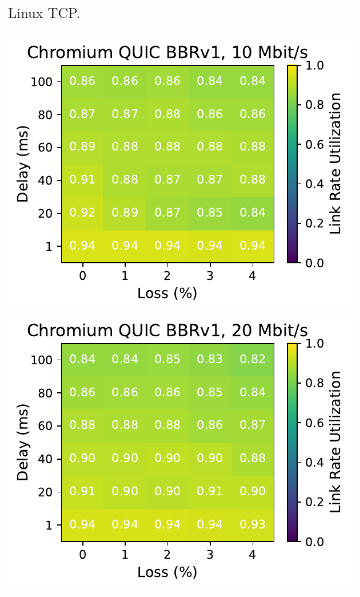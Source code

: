 \begin{figure}[ht]
\begin{subfigure}[b]{0.22\linewidth}
        \caption{Linux TCP.}
    \end{subfigure}
    \begin{subfigure}[b]{0.22\linewidth}
        \includegraphics[width=\linewidth,trim={0 0 2cm 0},clip]{figures/heatmaps/heatmap_quic_bbr1_10mbps.pdf}
        \includegraphics[width=\linewidth,trim={0 0 2cm 0},clip]{figures/heatmaps/heatmap_quic_bbr1_20mbps.pdf}

\end{subfigure}
\end{figure}
